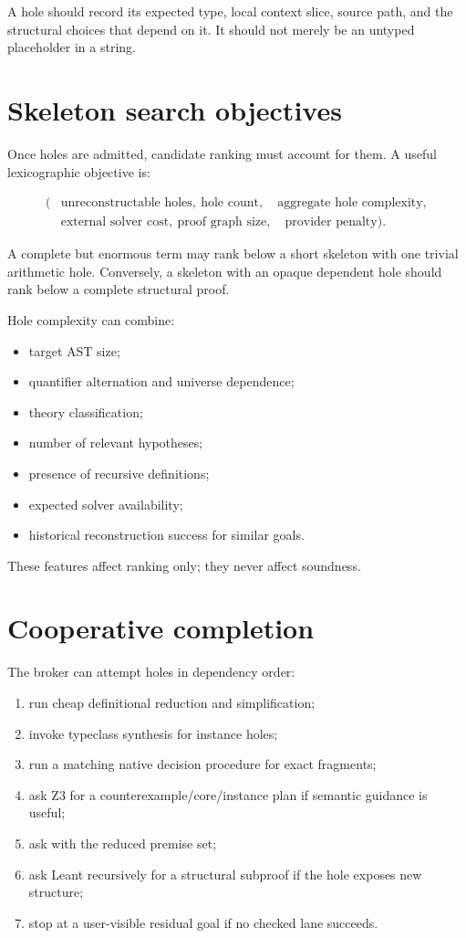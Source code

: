 \documentclass[11pt,letterpaper,openany]{report}
\newcommand{\code}[1]{\texttt{\detokenize{#1}}}
\begin{document}
A hole should record its expected type, local context slice, source path, and the
structural choices that depend on it. It should not merely be an untyped placeholder in
a string.

\section{Skeleton search objectives}

Once holes are admitted, candidate ranking must account for them. A useful
lexicographic objective is:

\[
\begin{aligned}
(&\text{unreconstructable holes},\ \text{hole count},\quad
  \text{aggregate hole complexity}, \\
 &\text{external solver cost},\ \text{proof graph size},\quad
  \text{provider penalty}).
\end{aligned}
\]

A complete but enormous term may rank below a short skeleton with one trivial
arithmetic hole. Conversely, a skeleton with an opaque dependent hole should rank
below a complete structural proof.

Hole complexity can combine:

\begin{itemize}
  \item target AST size;
  \item quantifier alternation and universe dependence;
  \item theory classification;
  \item number of relevant hypotheses;
  \item presence of recursive definitions;
  \item expected solver availability;
  \item historical reconstruction success for similar goals.
\end{itemize}

These features affect ranking only; they never affect soundness.

\section{Cooperative completion}

The broker can attempt holes in dependency order:

\begin{enumerate}
  \item run cheap definitional reduction and simplification;
  \item invoke typeclass synthesis for instance holes;
  \item run a matching native decision procedure for exact fragments;
  \item ask Z3 for a counterexample/core/instance plan if semantic guidance is useful;
  \item ask \code{grind} with the reduced premise set;
  \item ask Leant recursively for a structural subproof if the hole exposes new
        structure;
  \item stop at a user-visible residual goal if no checked lane succeeds.
\end{enumerate}
\end{document}
